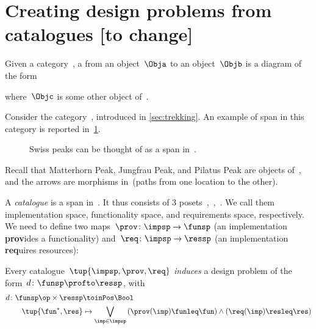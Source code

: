 

\section{Creating design problems from catalogues [to change]}
\label{sec:spans}

\begin{ctdefinition}[Span]
  \label{def:span}
  Given a category~\CatC, a \emph{} from an object~$\Obja$ to an object~$\Objb$ is a diagram of the form
  \begin{center}
  \end{center}
  where~$\Objc$ is some other object of~\CatC.
\end{ctdefinition}

\begin{example}
  Consider the category~\Berg, introduced in \cref{sec:trekking}. An example of span in this category is reported in~\cref{fig:exmountains}.
  \begin{figure}[h!]
    \begin{center}
    \end{center}
    \caption{Swiss peaks can be thought of as a span in~\Berg. \label{fig:exmountains}}
  \end{figure}
  Recall that \textsf{Matterhorn Peak}, \textsf{Jungfrau Peak}, and \textsf{Pilatus Peak} are objects of~\Berg, and the arrows are morphisms in~\Berg (paths from one location to the other).
\end{example}

\begin{definition}[Catalogue]
  \label{def:catalogue}
  A \emph{catalogue} is a span in~\Pos.
  It thus consists of 3 posets~\impsp,~\funsp,~\ressp.
  We call them implementation space, functionality space, and requirements space, respectively. We need to define two maps~$\prov \colon \impsp \to \funsp$ (an implementation \textbf{prov}ides a functionality) and~$\req\colon \impsp \to \ressp$ (an implementation \textbf{req}uires resources):
  \begin{center}
  \end{center}
\end{definition}

\begin{definition}
  Every catalogue~$\tup{\impsp,\prov,\req}$ \emph{induces} a design problem of the form~$d\colon \funsp \profto \ressp$, with
  \begin{equation*}
    \begin{aligned}
      d\colon \funsp \op \times \ressp &\toinPos \Bool\\
      \tup{\fun^*,\res}&\mapsto \bigvee_{\imp\in \impsp}\left(\prov(\imp)\funleq \fun \right)\wedge \left( \req(\imp)\resleq \res \right)
    \end{aligned}
  \end{equation*}
\end{definition}
